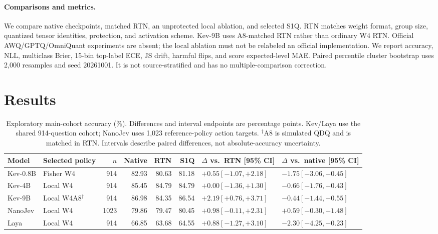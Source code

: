 \documentclass[10pt,twocolumn]{article}
\begin{document}
\paragraph{Comparisons and metrics.}
We compare native checkpoints, matched RTN, an unprotected local
ablation, and selected S1Q. RTN matches weight format, group size,
quantized tensor identities, protection, and activation scheme.
Kev-9B uses A8-matched RTN rather than ordinary W4 RTN.
Official AWQ/GPTQ/OmniQuant experiments are absent; the local ablation
must not be relabeled an official implementation.
We report accuracy, NLL, multiclass Brier, 15-bin top-label ECE,
JS drift, harmful flips, and score expected-level MAE.
Paired percentile cluster bootstrap uses 2,000 resamples and
seed 20261001. It is not source-stratified and has no
multiple-comparison correction.

\section{Results}
\begin{table}[t]
\centering\footnotesize
\setlength{\tabcolsep}{3.5pt}
\begin{tabular}{llrrrrll}
\toprule
Model & Selected policy & $n$ & Native & RTN & S1Q
 & $\Delta$ vs.\ RTN [95\% CI] & $\Delta$ vs.\ native [95\% CI]\\
\midrule
Kev-0.8B & Fisher W4 & 914 & 82.93 & 80.63 & 81.18 & $+0.55 [-1.07, +2.18]$ & $-1.75 [-3.06, -0.45]$ \\
Kev-4B & Local W4 & 914 & 85.45 & 84.79 & 84.79 & $+0.00 [-1.36, +1.30]$ & $-0.66 [-1.76, +0.43]$ \\
Kev-9B & Local W4A8$^{\dagger}$ & 914 & 86.98 & 84.35 & 86.54 & $+2.19 [+0.76, +3.71]$ & $-0.44 [-1.44, +0.55]$ \\
NanoJev & Local W4 & 1023 & 79.86 & 79.47 & 80.45 & $+0.98 [-0.11, +2.31]$ & $+0.59 [-0.30, +1.48]$ \\
Laya & Local W4 & 914 & 66.85 & 63.68 & 64.55 & $+0.88 [-1.27, +3.10]$ & $-2.30 [-4.25, -0.23]$ \\
\bottomrule
\end{tabular}
\caption{Exploratory main-cohort accuracy (\%). Differences and interval
endpoints are percentage points. Kev/Laya use the shared 914-question
cohort; NanoJev uses 1,023 reference-policy action targets.
$^\dagger$A8 is simulated QDQ and is matched in RTN.
Intervals describe paired differences, not absolute-accuracy uncertainty.}
\label{tab:main}
\end{table}
\end{document}
